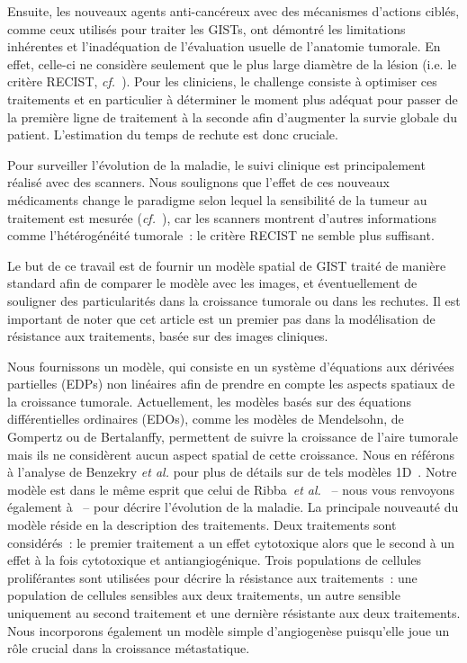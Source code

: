 \documentclass[11pt]{amsart}
\numberwithin{equation}{section}
\newcommand{\cf}{\textit{cf.}~}
\begin{document}
Ensuite, les nouveaux agents anti-cancéreux avec des mécanismes d'actions  ciblés, comme ceux utilisés pour traiter les GISTs, ont démontré les limitations inhérentes et l'inadéquation de  l'évaluation usuelle de l'anatomie tumorale. En effet, celle-ci ne considère seulement que le plus large diamètre de la lésion (i.e. le critère RECIST, \cf \cite{suzuki2008}). 
Pour les cliniciens, le challenge consiste à optimiser ces traitements et en particulier à déterminer le moment plus adéquat pour passer de la première ligne de traitement à la seconde afin d'augmenter la survie globale du patient. L'estimation du temps de rechute est donc cruciale.


Pour surveiller l'évolution de la maladie, le suivi clinique est principalement réalisé avec des scanners. 
Nous soulignons que l'effet de ces nouveaux médicaments change le paradigme selon lequel la sensibilité de la tumeur au traitement est mesurée (\cf \cite{schramm2013}), car les scanners montrent d'autres informations comme l'hétérogénéité tumorale~: le critère RECIST ne semble plus suffisant.


Le but de ce travail est de fournir un modèle spatial de GIST traité de manière standard afin de comparer le modèle avec les images, et éventuellement de souligner des particularités dans la croissance tumorale ou dans les rechutes. Il est important de noter que cet article est un premier pas dans la modélisation de résistance aux traitements, basée sur des images cliniques.


Nous fournissons un modèle, qui consiste en un système d'équations aux dérivées partielles (EDPs) non linéaires afin de prendre en compte les aspects spatiaux de la croissance tumorale. Actuellement, 
les modèles basés sur des équations différentielles ordinaires (EDOs), comme les modèles de Mendelsohn, de Gompertz ou de 
Bertalanffy, permettent de suivre la croissance de l'aire tumorale mais ils ne considèrent aucun aspect spatial de cette croissance. Nous en référons à l'analyse de Benzekry {\it et al.} pour plus de détails sur de tels modèles 1D~\cite{benzekry2014}. 
Notre modèle est dans le même esprit que celui de Ribba~{\it et
  al.}~\cite{Ribba2006532} -- nous vous renvoyons également à~\cite{Iollo2012,gallinato2014} -- pour  décrire l'évolution de la maladie. La principale nouveauté du modèle réside en la description des traitements. Deux traitements sont considérés~: le premier traitement a un effet cytotoxique alors que le second à un effet à la fois cytotoxique et antiangiogénique. Trois populations de cellules proliférantes sont utilisées pour décrire la résistance aux traitements~: une population de cellules sensibles aux deux traitements, un autre sensible uniquement au second traitement et une dernière résistante aux deux traitements.  
Nous incorporons également un modèle simple d'angiogenèse puisqu'elle joue un rôle crucial dans la croissance métastatique.
\end{document}

